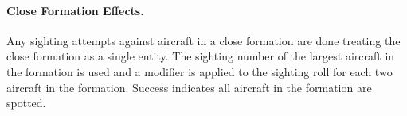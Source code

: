 \begin{advancedrules}
\paragraph{Close Formation Effects.} Any sighting attempts against aircraft in a close formation are done treating the close formation as a single entity. The sighting number of the largest aircraft in the formation is used and a  modifier is applied to the sighting roll for each two aircraft in the formation. Success indicates all aircraft in the formation are spotted.

\end{advancedrules}
